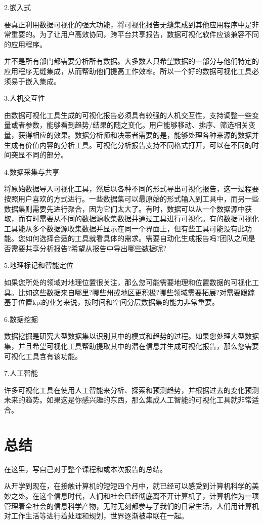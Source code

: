 \documentclass{article}
\begin{document}
\begin{itemize}
    	2.嵌入式\par	
    	要真正利用数据可视化的强大功能，将可视化报告无缝集成到其他应用程序中是非常重要的。为了让用户高效协同，跨平台共享报告，数据可视化软件应该兼容不同的应用程序。\par
    	并不是所有部门都需要分析所有数据。大多数人只希望数据的一部分与他们特定的应用程序无缝集成，从而帮助他们提高工作效率。所以一个好的数据可视化工具必须易于嵌入集成。\par
    	3.人机交互性\par
    	由数据可视化工具生成的可视化报告必须具有较强的人机交互性，支持调整一些变量或者参数，能够看到趋势/结果的随之变化。用户能够移动、排序、筛选相关变量，获得相应的效果。数据分析师和决策者需要的是，能够处理各种来源的数据并生成有价值内容的分析工具。可视化分析报告支持不同格式打开，可以在不同的时间突显不同的部分。\par
    	4.数据采集与共享\par   	
    	将原始数据导入可视化工具，然后以各种不同的形式导出可视化报告，这一过程要按照用户喜欢的方式进行。一些数据集可以最原始的形式输入到工具中，而另一些数据集则需要先进行聚合，因为它们太大了。有时，数据可以从一个数据源中获取，而有时需要从不同的数据源收集数据并通过工具进行可视化。有的数据可视化工具能从多个数据源收集数据并显示在同一个界面上，但有些工具可能没有此功能。您如何选择合适的工具就看具体的需求。需要自动化生成报告吗?团队之间是否需要共享分析报告?希望从报告中导出哪些数据呢?\par
    	5.地理标记和智能定位\par
    	如果您所处的领域对地理位置很关注，那么您可能需要地理和位置数据的可视化工具。比如这些数据来自哪里?哪些州或地区更积极?哪些领域需要拓展?对需要跟踪基于位置kpi的业务来说，按时间和空间分层数据集的能力非常重要。\par
    	6.数据挖掘\par
    	数据挖掘是研究大型数据集以识别其中的模式和趋势的过程。如果您处理大型数据集，并且希望可视化工具帮助提取其中的潜在信息并生成可视化报告，那么您需要可视化工具含有该功能。\par
    	7.人工智能\par
    	许多可视化工具在使用人工智能来分析、探索和预测趋势，并根据过去的变化预测未来的趋势。如果这是你感兴趣的东西，那么集成人工智能的可视化工具就非常适合。
\end{itemize}


\section{总结}
在这里，写自己对于整个课程和或本次报告的总结。\par
从开学到现在，在接触计算机的短短四个月中，就已经可以感受到计算机科学的美妙之处。在这个信息时代，人们和社会已经彻底离不开计算机了，计算机作为一项管理着全社会的信息科学产物，无时无刻都参与了我们的日常生活，人们用计算机对工作生活等进行着处理和规划，世界逐渐被串联在一起。\par
\end{document}
